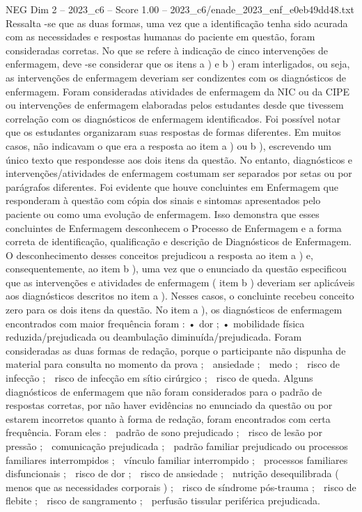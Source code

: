 \begin{textsample}{NEG Dim 2 – 2023\_c6 – Score 1.00 – 2023\_c6/enade\_2023\_enf\_e0eb49dd48.txt}
Ressalta -se que as duas formas, uma vez que a identificação tenha sido acurada com as necessidades e respostas humanas do paciente em questão, foram consideradas corretas.
No que se refere à indicação de cinco intervenções de enfermagem, deve -se considerar que os itens a ) e b ) eram interligados, ou seja, as intervenções de enfermagem deveriam ser condizentes com os diagnósticos de enfermagem.
Foram consideradas atividades de enfermagem da NIC ou da CIPE ou intervenções de enfermagem elaboradas pelos estudantes desde que tivessem correlação com os diagnósticos de enfermagem identificados.
Foi possível notar que os estudantes organizaram suas respostas de formas diferentes.
Em muitos casos, não indicavam o que era a resposta ao item a ) ou b ), escrevendo um único texto que respondesse aos dois itens da questão.
No entanto, diagnósticos e intervenções/atividades de enfermagem costumam ser separados por setas ou por parágrafos diferentes.
Foi evidente que houve concluintes em Enfermagem que responderam à questão com cópia dos sinais e sintomas apresentados pelo paciente ou como uma evolução de enfermagem.
Isso demonstra que esses concluintes de Enfermagem desconhecem o Processo de Enfermagem e a forma correta de identificação, qualificação e descrição de Diagnósticos de Enfermagem.
O desconhecimento desses conceitos prejudicou a resposta ao item a ) e, consequentemente, ao item b ), uma vez que o enunciado da questão especificou que as intervenções e atividades de enfermagem ( item b ) deveriam ser aplicáveis aos diagnósticos descritos no item a ).
Nesses casos, o concluinte recebeu conceito zero para os dois itens da questão.
No item a ), os diagnósticos de enfermagem encontrados com maior frequência foram : • dor ; • mobilidade física reduzida/prejudicada ou deambulação diminuída/prejudicada.
Foram consideradas as duas formas de redação, porque o participante não dispunha de material para consulta no momento da prova ;  ansiedade ;  medo ;  risco de infecção ;  risco de infecção em sítio cirúrgico ;  risco de queda.
Alguns diagnósticos de enfermagem que não foram considerados para o padrão de respostas corretas, por não haver evidências no enunciado da questão ou por estarem incorretos quanto à forma de redação, foram encontrados com certa frequência.
Foram eles :  padrão de sono prejudicado ;  risco de lesão por pressão ;  comunicação prejudicada ;  padrão familiar prejudicado ou processos familiares interrompidos ;  vínculo familiar interrompido ;  processos familiares disfuncionais ;  risco de dor ;  risco de ansiedade ;  nutrição desequilibrada ( menos que as necessidades corporais ) ;  risco de síndrome pós-trauma ;  risco de flebite ;  risco de sangramento ;  perfusão tissular periférica prejudicada.

\end{textsample}
